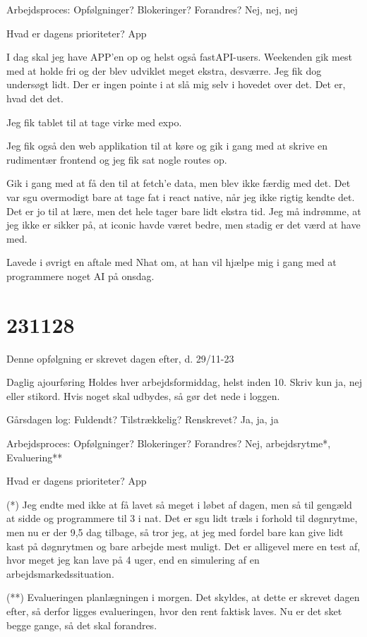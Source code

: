 \documentclass{report}
\begin{document}
Arbejdsproces: Opfølgninger? Blokeringer? Forandres?
Nej, nej, nej
 
Hvad er dagens prioriteter?
App
 
I dag skal jeg have APP'en op og helst også fastAPI-users.
Weekenden gik mest med at holde fri og der blev udviklet meget ekstra, desværre. Jeg fik dog undersøgt lidt.
Der er ingen pointe i at slå mig selv i hovedet over det. Det er, hvad det det.

Jeg fik tablet til at tage virke med expo.
 
Jeg fik også den web applikation til at køre og gik i gang med at skrive en rudimentær frontend og jeg fik sat nogle routes op.
 
Gik i gang med at få den til at fetch'e data, men blev ikke færdig med det.
Det var sgu overmodigt bare at tage fat i react native, når jeg ikke rigtig kendte det. Det er jo til at lære, men det hele tager bare lidt ekstra tid. Jeg må indrømme, at jeg ikke er sikker på, at iconic havde været bedre, men stadig er det værd at have med.
 
Lavede i øvrigt en aftale med Nhat om, at han vil hjælpe mig i gang med at programmere noget AI på onsdag. 

\section{231128}
Denne opfølgning er skrevet dagen efter, d. 29/11-23
 
Daglig ajourføring
Holdes hver arbejdsformiddag, helst inden 10. Skriv kun ja, nej eller stikord. Hvis noget skal udbydes, så gør det nede i loggen.
 
Gårsdagen log: Fuldendt? Tilstrækkelig? Renskrevet?
Ja, ja, ja
 
Arbejdsproces: Opfølgninger? Blokeringer? Forandres?
Nej, arbejdsrytme*, Evaluering**
 
Hvad er dagens prioriteter?
App
 
(*) Jeg endte med ikke at få lavet så meget i løbet af dagen, men så til gengæld at sidde og programmere til 3 i nat. Det er sgu lidt træls i forhold til døgnrytme, men nu er der 9,5 dag tilbage, så tror jeg, at jeg med fordel bare kan give lidt kast på døgnrytmen og bare arbejde mest muligt.
Det er alligevel mere en test af, hvor meget jeg kan lave på 4 uger, end en simulering af en arbejdsmarkedssituation.
 
(**) Evalueringen planlægningen i morgen. Det skyldes, at dette er skrevet dagen efter, så derfor ligges evalueringen, hvor den rent faktisk laves. Nu er det sket begge gange, så det skal forandres.
 
\end{document}
